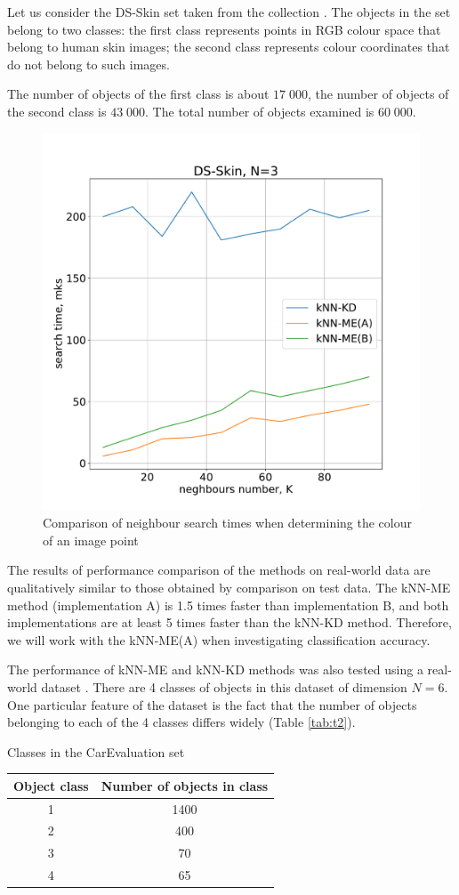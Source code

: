 \documentclass[entropy,article,submit,moreauthors,pdftex]{Definitions/mdpi}
\begin{document}
\begin{paracol}{2}
Let us consider the DS-Skin set taken from the collection \cite{ds-1}. The objects in the set belong to two classes: the first class represents points in RGB colour space that belong to human skin images; the second class represents colour coordinates that do not belong to such images.

The number of objects of the first class is about $17\;000$, the number of objects of the second class is $43\;000$. The total number of objects examined is $60\;000$.

\begin{figure}[h]
\widefigure
\includegraphics[width=0.5\linewidth]{fig6.pdf}
\caption{Comparison of neighbour search times when determining the colour of an image point\label{fig6}}
\end{figure}

The results of performance comparison of the methods on real-world data are qualitatively similar to those obtained by comparison on test data. The kNN-ME method (implementation A) is 1.5 times faster than implementation B, and both implementations are at least 5 times faster than the kNN-KD method. Therefore, we will work with the kNN-ME(A) when investigating classification accuracy.

The performance of kNN-ME and kNN-KD methods was also tested using a real-world dataset \cite{ds-2}. There are 4 classes of objects in this dataset of dimension $N = 6$. One particular feature of the dataset is the fact that the number of objects belonging to each of the 4 classes differs widely (Table \ref{tab:t2}).

\begin{specialtable}[H] 
  \caption{Classes in the CarEvaluation set}\label{tab:t2}
	\center
\begin{tabular}{cc}
\toprule
	  Object class & Number of objects in class \\
\midrule													
		1 & 1400 \\ 
		2 & 400 \\
		3 & 70 \\
		4 & 65 \\
\bottomrule
\end{tabular}
\end{specialtable}


\end{paracol}
\end{document}
